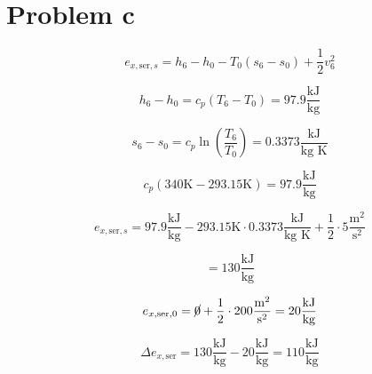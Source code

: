 \section*{Problem c}

\[
e_{x, \text{ser}, s} = h_6 - h_0 - T_0 (s_6 - s_0) + \frac{1}{2} v_6^2
\]

\[
h_6 - h_0 = c_p (T_6 - T_0) = 97.9 \frac{\text{kJ}}{\text{kg}}
\]

\[
s_6 - s_0 = c_p \ln \left( \frac{T_6}{T_0} \right) = 0.3373 \frac{\text{kJ}}{\text{kg K}}
\]

\[
c_p (340 \text{K} - 293.15 \text{K}) = 97.9 \frac{\text{kJ}}{\text{kg}}
\]

\[
e_{x, \text{ser}, s} = 97.9 \frac{\text{kJ}}{\text{kg}} - 293.15 \text{K} \cdot 0.3373 \frac{\text{kJ}}{\text{kg K}} + \frac{1}{2} \cdot 5 \frac{\text{m}^2}{\text{s}^2}
\]

\[
= 130 \frac{\text{kJ}}{\text{kg}}
\]

\[
e_{x, \text{ser}, 0} = \cancel{0} + \frac{1}{2} \cdot 200 \frac{\text{m}^2}{\text{s}^2} = 20 \frac{\text{kJ}}{\text{kg}}
\]

\[
\Delta e_{x, \text{ser}} = 130 \frac{\text{kJ}}{\text{kg}} - 20 \frac{\text{kJ}}{\text{kg}} = 110 \frac{\text{kJ}}{\text{kg}}
\]